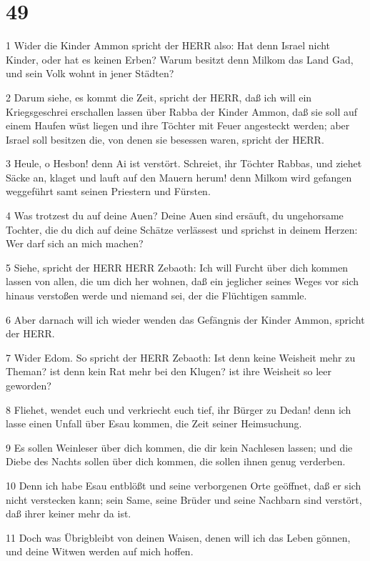 \chapter{49}

\par 1 Wider die Kinder Ammon spricht der HERR also: Hat denn Israel nicht Kinder, oder hat es keinen Erben? Warum besitzt denn Milkom das Land Gad, und sein Volk wohnt in jener Städten?
\par 2 Darum siehe, es kommt die Zeit, spricht der HERR, daß ich will ein Kriegsgeschrei erschallen lassen über Rabba der Kinder Ammon, daß sie soll auf einem Haufen wüst liegen und ihre Töchter mit Feuer angesteckt werden; aber Israel soll besitzen die, von denen sie besessen waren, spricht der HERR.
\par 3 Heule, o Hesbon! denn Ai ist verstört. Schreiet, ihr Töchter Rabbas, und ziehet Säcke an, klaget und lauft auf den Mauern herum! denn Milkom wird gefangen weggeführt samt seinen Priestern und Fürsten.
\par 4 Was trotzest du auf deine Auen? Deine Auen sind ersäuft, du ungehorsame Tochter, die du dich auf deine Schätze verlässest und sprichst in deinem Herzen: Wer darf sich an mich machen?
\par 5 Siehe, spricht der HERR HERR Zebaoth: Ich will Furcht über dich kommen lassen von allen, die um dich her wohnen, daß ein jeglicher seines Weges vor sich hinaus verstoßen werde und niemand sei, der die Flüchtigen sammle.
\par 6 Aber darnach will ich wieder wenden das Gefängnis der Kinder Ammon, spricht der HERR.
\par 7 Wider Edom. So spricht der HERR Zebaoth: Ist denn keine Weisheit mehr zu Theman? ist denn kein Rat mehr bei den Klugen? ist ihre Weisheit so leer geworden?
\par 8 Fliehet, wendet euch und verkriecht euch tief, ihr Bürger zu Dedan! denn ich lasse einen Unfall über Esau kommen, die Zeit seiner Heimsuchung.
\par 9 Es sollen Weinleser über dich kommen, die dir kein Nachlesen lassen; und die Diebe des Nachts sollen über dich kommen, die sollen ihnen genug verderben.
\par 10 Denn ich habe Esau entblößt und seine verborgenen Orte geöffnet, daß er sich nicht verstecken kann; sein Same, seine Brüder und seine Nachbarn sind verstört, daß ihrer keiner mehr da ist.
\par 11 Doch was Übrigbleibt von deinen Waisen, denen will ich das Leben gönnen, und deine Witwen werden auf mich hoffen.
